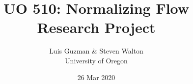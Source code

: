 \documentclass[pdf,11pt]{beamer}
\title{UO 510: Normalizing Flow Research Project
}
\author{Luis Guzman \& Steven Walton\\ \small University of Oregon}
\date{26 Mar 2020}
\begin{document}
\frame{\titlepage}


%

%
%
\end{document}
